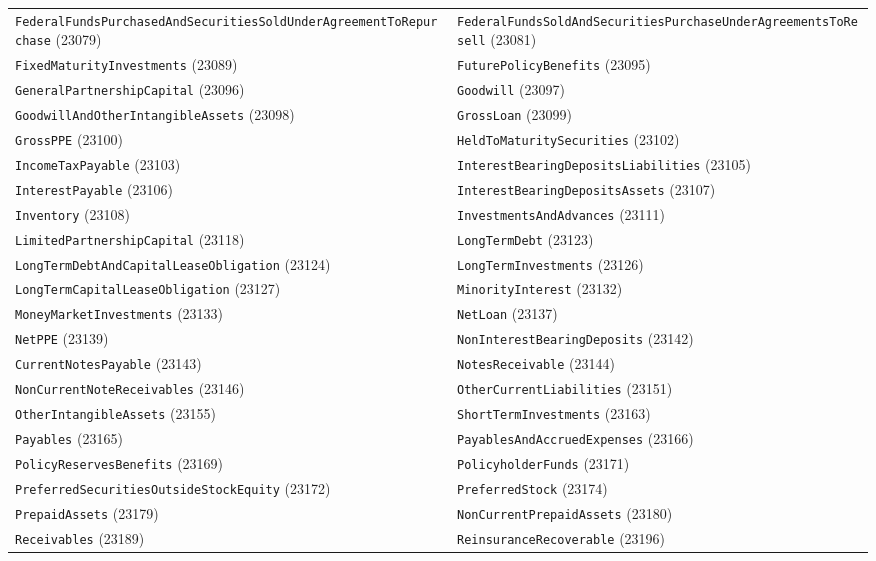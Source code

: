 \documentclass[11pt,a4paper]{report}
\begin{document}
\begin{subappendices}
{\begin{longtable}{@{}p{}p{}@{}}
\texttt{FederalFundsPurchasedAndSecuritiesSoldUnderAgreementToRepurchase} (23079) & \texttt{FederalFundsSoldAndSecuritiesPurchaseUnderAgreementsToResell} (23081) \\
\texttt{FixedMaturityInvestments} (23089) & \texttt{FuturePolicyBenefits} (23095) \\
\texttt{GeneralPartnershipCapital} (23096) & \texttt{Goodwill} (23097) \\
\texttt{GoodwillAndOtherIntangibleAssets} (23098) & \texttt{GrossLoan} (23099) \\
\texttt{GrossPPE} (23100) & \texttt{HeldToMaturitySecurities} (23102) \\
\texttt{IncomeTaxPayable} (23103) & \texttt{InterestBearingDepositsLiabilities} (23105) \\
\texttt{InterestPayable} (23106) & \texttt{InterestBearingDepositsAssets} (23107) \\
\texttt{Inventory} (23108) & \texttt{InvestmentsAndAdvances} (23111) \\
\texttt{LimitedPartnershipCapital} (23118) & \texttt{LongTermDebt} (23123) \\
\texttt{LongTermDebtAndCapitalLeaseObligation} (23124) & \texttt{LongTermInvestments} (23126) \\
\texttt{LongTermCapitalLeaseObligation} (23127) & \texttt{MinorityInterest} (23132) \\
\texttt{MoneyMarketInvestments} (23133) & \texttt{NetLoan} (23137) \\
\texttt{NetPPE} (23139) & \texttt{NonInterestBearingDeposits} (23142) \\
\texttt{CurrentNotesPayable} (23143) & \texttt{NotesReceivable} (23144) \\
\texttt{NonCurrentNoteReceivables} (23146) & \texttt{OtherCurrentLiabilities} (23151) \\
\texttt{OtherIntangibleAssets} (23155) & \texttt{ShortTermInvestments} (23163) \\
\texttt{Payables} (23165) & \texttt{PayablesAndAccruedExpenses} (23166) \\
\texttt{PolicyReservesBenefits} (23169) & \texttt{PolicyholderFunds} (23171) \\
\texttt{PreferredSecuritiesOutsideStockEquity} (23172) & \texttt{PreferredStock} (23174) \\
\texttt{PrepaidAssets} (23179) & \texttt{NonCurrentPrepaidAssets} (23180) \\
\texttt{Receivables} (23189) & \texttt{ReinsuranceRecoverable} (23196) \\

\end{longtable}}
\end{subappendices}
\end{document}
